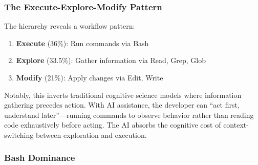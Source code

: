\begin{table}[h]
\caption{Top 10 Tool Usage}
\label{tab:toptools}
\end{table}

\subsubsection{The Execute-Explore-Modify Pattern}

The hierarchy reveals a workflow pattern:
\begin{enumerate}
    \item \textbf{Execute} (36\%): Run commands via Bash
    \item \textbf{Explore} (33.5\%): Gather information via Read, Grep, Glob
    \item \textbf{Modify} (21\%): Apply changes via Edit, Write
\end{enumerate}

Notably, this inverts traditional cognitive science models where information gathering precedes action. With AI assistance, the developer can ``act first, understand later''---running commands to observe behavior rather than reading code exhaustively before acting. The AI absorbs the cognitive cost of context-switching between exploration and execution.

\subsubsection{Bash Dominance}

